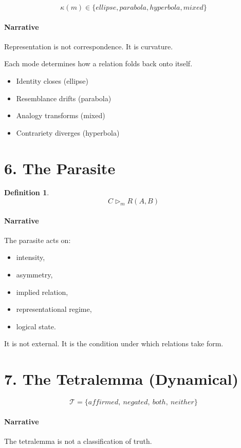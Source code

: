 \documentclass[11pt]{article}
\newtheorem{definition}{Definition}
\begin{document}
\[
\kappa(m) \in \{ellipse, parabola, hyperbola, mixed\}
\]

\paragraph{Narrative}
Representation is not correspondence.
It is curvature.

Each mode determines how a relation folds back onto itself.

\begin{itemize}
\item Identity closes (ellipse)
\item Resemblance drifts (parabola)
\item Analogy transforms (mixed)
\item Contrariety diverges (hyperbola)
\end{itemize}

\section{6. The Parasite}

\begin{definition}
\[
C \triangleright_m R(A,B)
\]
\end{definition}

\paragraph{Narrative}
The parasite acts on:
\begin{itemize}
\item intensity,
\item asymmetry,
\item implied relation,
\item representational regime,
\item logical state.
\end{itemize}

It is not external.
It is the condition under which relations take form.

\section{7. The Tetralemma (Dynamical)}

\[
\mathcal{T} = \{affirmed,\ negated,\ both,\ neither\}
\]

\paragraph{Narrative}
The tetralemma is not a classification of truth.
\end{document}
